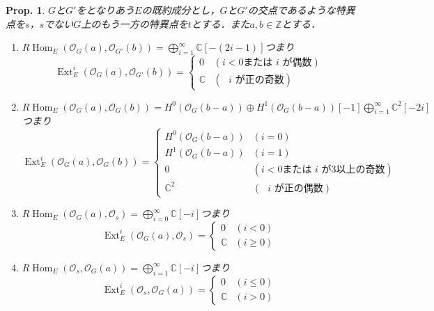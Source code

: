 \documentclass[uplatex,a4paper,11pt,dvipdfmx]{jsarticle}
\theoremstyle{mystyle} %
\newtheorem{proposition}[theorem]{Prop.}
\DeclareMathOperator{\Hom}{Hom}
\DeclareMathOperator{\Ext}{Ext}
\begin{document}
\begin{proposition}
	$G$と$G'$をとなりあう$E$の既約成分とし，$G$と$G'$の交点であるような特異点を$s$，$s$でない$G$上のもう一方の特異点を$t$とする．また$a, b \in \mathbb{Z}$とする．
	\begin{enumerate}
		\item $R\Hom_E(\mathcal{O}_G(a), \mathcal{O}_{G'}(b)) = \bigoplus_{i=1}^\infty \mathbb{C}[-(2i-1)]$つまり$$\Ext^i_E(\mathcal{O}_G(a), \mathcal{O}_{G'}(b)) = \left \{
			      \begin{array}{ll}
				      0          & (i<0 \text{または $i$ が偶数}) \\
				      \mathbb{C} & (\text{ $i$ が正の奇数})
			      \end{array}
			      \right.$$
		\item $R\Hom_E(\mathcal{O}_G(a), \mathcal{O}_G(b)) = H^0(\mathcal{O}_G(b-a)) \oplus H^1(\mathcal{O}_G(b-a))[-1]\bigoplus_{i=1}^\infty \mathbb{C}^2[-2i]$つまり$$\Ext^i_E(\mathcal{O}_G(a), \mathcal{O}_G(b)) =\left \{
			      \begin{array}{ll}
				      H^0(\mathcal{O}_G(b-a)) & (i=0)                                     \\
				      H^1(\mathcal{O}_G(b-a)) & (i=1)                                     \\
				      0                       & (i < 0 \text{または $i$ が$3$以上の奇数}) \\
				      \mathbb{C}^2            & (\text{ $i$ が正の偶数})
			      \end{array}
			      \right.$$
		\item $R\Hom_E(\mathcal{O}_G(a), \mathcal{O}_s) = \bigoplus_{i=0}^\infty \mathbb{C}[-i]$つまり$$\Ext^i_E(\mathcal{O}_G(a), \mathcal{O}_s) =\left \{
			      \begin{array}{ll}
				      0          & (i< 0)    \\
				      \mathbb{C} & (i\geq 0)
			      \end{array}
			      \right.$$
		\item $R\Hom_E(\mathcal{O}_s, \mathcal{O}_G(a)) = \bigoplus_{i=1}^\infty \mathbb{C}[-i]$つまり$$\Ext^i_E(\mathcal{O}_s, \mathcal{O}_G(a)) =\left \{
			      \begin{array}{ll}
				      0          & (i\leq 0) \\
				      \mathbb{C} & (i>0)
			      \end{array}
			      \right.$$
	\end{enumerate}
\end{proposition}
\end{document}
